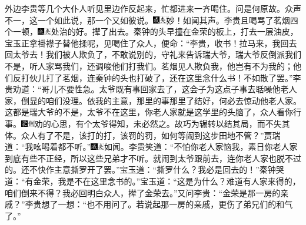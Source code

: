 外边李贵等几个大仆人听见里边作反起来，忙都进来一齐喝住。问是何原故。众声不一，这一个如此说，那一个又如彼说。{\includegraphics[width=3mm]{../Images/00005}\includegraphics[width=3mm]{../Images/00012}\footnotesize \kaishu 妙！如闻其声。}李贵且喝骂了茗烟四个一顿，{\includegraphics[width=3mm]{../Images/00005}\includegraphics[width=3mm]{../Images/00012}\footnotesize \kaishu 处治的好。}撵了出去。秦钟的头早撞在金荣的板上，打去一层油皮，宝玉正拿褂襟子替他揉呢，见喝住了众人，便命：``李贵，收书！拉马来，我回去回太爷去！我们被人欺负了，不敢说别的，守礼来告诉瑞大爷，瑞大爷反倒派我们不是，听人家骂我们，还调唆他们打我们。茗烟见人欺负我，他岂有不为我的；他们反打伙儿打了茗烟，连秦钟的头也打破了，还在这里念什么书！不如散了罢。''李贵劝道：``哥儿不要性急。太爷既有事回家去了，这会子为这点子事去聒噪他老人家，倒显的咱们没理。依我的主意，那里的事那里了结好，何必去惊动他老人家。这都是瑞大爷的不是，太爷不在这里，你老人家就是这学里的头脑了，众人看你行事。{\includegraphics[width=3mm]{../Images/00006}\includegraphics[width=3mm]{../Images/00011}\footnotesize \kaishu 劝的心思，有个太爷得知，未必然之。故巧为辗转以结其局，而不失其体。}众人有了不是，该打的打，该罚的罚，如何等闹到这步田地不管？''贾瑞道：``我吆喝着都不听。''{\includegraphics[width=3mm]{../Images/00005}\includegraphics[width=3mm]{../Images/00012}\footnotesize \kaishu 如闻。}李贵笑道：``不怕你老人家恼我，素日你老人家到底有些不正经，所以这些兄弟才不听。就闹到太爷跟前去，连你老人家也脱不过的。还不快作主意撕罗开了罢。''宝玉道：``撕罗什么？我必是回去的！''秦钟哭道：``有金荣，我是不在这里念书的。''宝玉道：``这是为什么？难道有人家来得的，咱们倒来不得？我必回明白众人，撵了金荣去。''又问李贵：``金荣是那一房的亲戚？''李贵想了一想：``也不用问了。若说起那一房的亲戚，更伤了弟兄们的和气了。''

